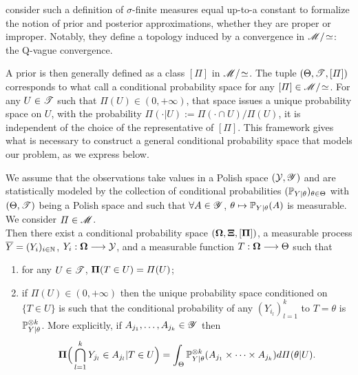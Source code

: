 \citet{bioche_approximation_2016} consider such a definition of $\sigma$-finite measures equal up-to-a constant to formalize the notion of prior and posterior approximations, whether they are proper or improper. Notably, they define a topology induced by a convergence in $\mathscr{M}/\!\simeq$: the Q-vague convergence. %


A prior is then generally defined as a class $[\varPi]$ in $\mathscr{M}/\!\simeq$.
The tuple $(\Theta,\mathscr{T},[\varPi])$ corresponds to what \citet{taraldsen_conditional_2016} call a conditional probability space for any $[\varPi]\in\mathscr{M}/\!\simeq$.
For any $U \in \mathscr{T}$ such that 
$\varPi(U)\in (0,+\infty)$, 
that space issues a unique probability space on $U$, with the probability $\varPi(\cdot|U):=\varPi(\cdot\cap U)/\varPi(U)$, it is independent of the choice of the representative of $[\varPi]$.
This framework gives what is necessary to construct a general conditional probability space that models our problem, as we express below.


\begin{prop}\label{prop:intro-ref:kolmog}
We assume that the observations take values in a 
Polish space $(\mathcal{Y},\mathscr{Y})$ and are statistically modeled by the collection of conditional probabilities $(\mathbb{P}_{Y|\theta})_{\theta\in\Theta}$ with $(\Theta,\mathscr{T})$ being a Polish space and such that $\forall A\in\mathscr{Y}$, $\theta\mapsto\mathbb{P}_{Y|\theta}(A)$ is measurable. We consider $\varPi\in\mathscr{M}$.\\
Then there exist a conditional probability space $(\mathbf{\Omega}, \mathbf{\Xi}, [\mathbf{\Pi}])$, a measurable process $\overline Y=(Y_i)_{i\in\mathbb{N}}$, $Y_i:\mathbf{\Omega}\longrightarrow\mathcal{Y}$, and a measurable function $T:\mathbf{\Omega}\longrightarrow\Theta$ such that
    \begin{enumerate}
        \item for any $U\in\mathscr{T}$, $\mathbf{\Pi}(T\in U)=\varPi(U)$; 
        \item if 
        $\varPi(U) \in  (0,+\infty)$ 
        then the unique probability space conditioned on $\{T\in U\}$ is such that the conditional probability of any $(Y_{i_l})_{l=1}^k$ to $T=\theta$ is $\mathbb{P}_{Y|\theta}^{\otimes k}$. More explicitly, if $A_{j_1},\dots,A_{j_k}\in\mathscr{Y}$ then
            \begin{equation}
                \mathbf{\Pi}\Big(\bigcap_{l=1}^kY_{j_l}\in A_{j_l}|T\in U\Big) = \int_\Theta\mathbb{P}_{Y|\theta}^{\otimes k}(A_{j_1}\times\dots\times A_{j_k})d\varPi(\theta| U).
            \end{equation}
    \end{enumerate}
\end{prop}

